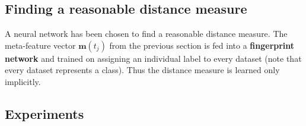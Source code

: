 \documentclass{article}
\begin{document}
\subsection{Finding a reasonable distance measure}
\label{sec:expressiveDist}

A neural network has been chosen to find a reasonable distance measure. The meta-feature vector $\mathbf{m}(t_j)$ from the previous section is fed into a \textbf{fingerprint network} and trained on assigning an individual label to every dataset (note that every dataset represents a class). Thus the distance measure is learned only implicitly.


\subsection{Experiments}
\label{sec:expressiveMeta}
\end{document}
